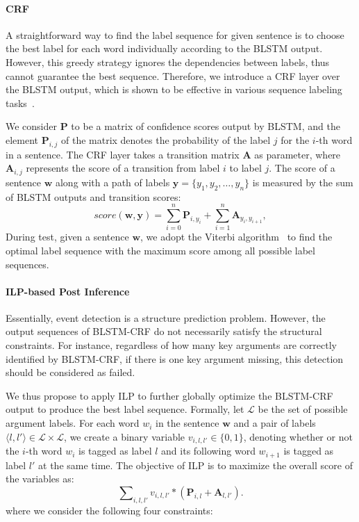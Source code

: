 \paragraph{CRF}
A straightforward way to find the label sequence for given sentence is to choose the
best label for each word individually according to the BLSTM output.
However, this greedy strategy ignores the dependencies between labels, thus cannot guarantee the best sequence.  %
Therefore, we introduce a CRF layer over the BLSTM output, which is shown to be effective in various sequence labeling tasks~\cite{collobert2011natural,huang2015bidirectional}. %

We consider $\textbf{P}$ to be a matrix of confidence scores output by BLSTM, and the element $\textbf{P}_{i,j}$ of the matrix denotes the probability of the label $j$ for the $i$-th word in a sentence. The CRF layer takes a transition matrix $\textbf{A}$ as parameter, where $\textbf{A}_{i,j}$ represents the score of a transition from label $i$ to label $j$. The score of a sentence $\bm{w}$ along with a path of labels $\bm{y} = \{y_1, y_2, \ldots, y_n\}$ is measured by the sum of BLSTM outputs and transition scores:
\begin{equation}
	score(\bm{w}, \bm{y}) = \sum\limits_{i=0}^n\textbf{P}_{i, y_i} + \sum\limits_{i=1}^n\textbf{A}_{y_i, y_{i+1}},
\end{equation}
During test, given a sentence $\bm{w}$, we adopt the Viterbi algorithm~\cite{rabiner1989tutorial} to find the optimal label sequence with the maximum score among all possible label sequences.

\paragraph{ILP-based Post Inference}
Essentially, event detection is a structure prediction problem. However, the output sequences of BLSTM-CRF do not necessarily satisfy the
structural constraints. For instance, regardless of how many key arguments are correctly identified by BLSTM-CRF, if there is one key
argument missing, this detection should be considered as failed.

We thus propose to apply ILP to further globally optimize the BLSTM-CRF output  to produce the best label sequence. Formally, let
$\mathcal{L}$ be the set of possible argument labels. For each word $w_i$ in the sentence $\bm{w}$ and a pair of labels $ \langle l, l'
\rangle \in \mathcal{L} \times \mathcal{L}$, we create a binary variable ${v_{i,l,l'} \in \{0, 1\}}$, denoting whether or not the $i$-th
word $w_i$ is tagged as label $l$ and its following word $w_{i+1}$ is tagged as label $l'$ at the same time. The objective of ILP is to
maximize the overall score of the variables as:
\begin{displaymath}
	\sum\nolimits_{i, l, l'}v_{i,l,l'} * (\textbf{P}_{i,l}+\textbf{A}_{l,l'}) .
\end{displaymath}
where we consider the following four constraints:

